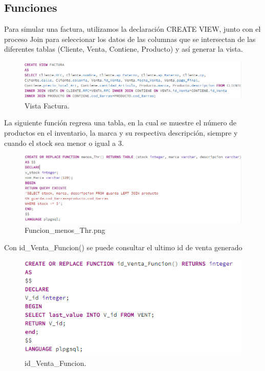 \documentclass[12pt,letterpaper]{article}
\begin{document}
	\subsection{Funciones} 
	Para simular una factura, utilizamos la declaración CREATE VIEW, junto con el proceso Join para seleccionar los datos de las columnas que se intersectan de las diferentes tablas (Cliente, Venta, Contiene, Producto) y así generar la vista.
	\begin{figure}[H]
		\centering
		\includegraphics[scale=0.70]{Documentacion/img/VistaFactura.PNG}
		\caption{Vista Factura.}
	\end{figure}
	La siguiente función regresa una tabla, en la cual se muestre el número de productos en el inventario, la marca y su respectiva descripción, siempre y cuando el stock sea menor o igual a 3. 
	\begin{figure}[H]
		\centering
		\includegraphics[scale=0.60]{Documentacion/img/Funcion_menos_Thr.PNG}
		\caption{Funcion\_menos\_Thr.png}
	\end{figure}
	Con id\_Venta\_Funcion() se puede consultar el ultimo id de venta generado
	\begin{figure}[H]
		\centering
		\includegraphics[scale=0.70]{Documentacion/img/id_Venta_Funcion.PNG}
		\caption{id\_Venta\_Funcion.}
	\end{figure}
\end{document}
